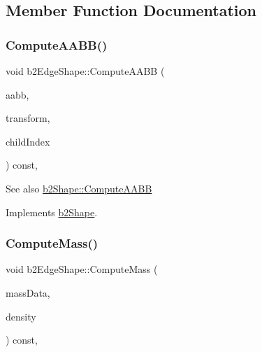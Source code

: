 \subsection{Member Function Documentation}
\mbox{\label{classb2EdgeShape_a238139ae1736b457d77443133ff16854}} 
\subsubsection{\texorpdfstring{Compute\+A\+A\+B\+B()}{ComputeAABB()}}
{\footnotesize\ttfamily void b2\+Edge\+Shape\+::\+Compute\+A\+A\+BB (\begin{DoxyParamCaption}\item[{\mbox{\hyperlink{structb2AABB}{b2\+A\+A\+BB}} $\ast$}]{aabb,  }\item[{const \mbox{\hyperlink{structb2Transform}{b2\+Transform}} \&}]{transform,  }\item[{int32}]{child\+Index }\end{DoxyParamCaption}) const\hspace{0.3cm}{\ttfamily [override]}, {\ttfamily [virtual]}}

\begin{DoxySeeAlso}{See also}
\mbox{\hyperlink{classb2Shape_a88e9807fab0c8ca9a98d8926e50a1411}{b2\+Shape\+::\+Compute\+A\+A\+BB}} 
\end{DoxySeeAlso}


Implements \mbox{\hyperlink{classb2Shape_a88e9807fab0c8ca9a98d8926e50a1411}{b2\+Shape}}.

\mbox{\label{classb2EdgeShape_ac738c1e0ab2f4dfbab26e3942efa60af}} 
\subsubsection{\texorpdfstring{Compute\+Mass()}{ComputeMass()}}
{\footnotesize\ttfamily void b2\+Edge\+Shape\+::\+Compute\+Mass (\begin{DoxyParamCaption}\item[{\mbox{\hyperlink{structb2MassData}{b2\+Mass\+Data}} $\ast$}]{mass\+Data,  }\item[{float32}]{density }\end{DoxyParamCaption}) const\hspace{0.3cm}{\ttfamily [override]}, {\ttfamily [virtual]}}

